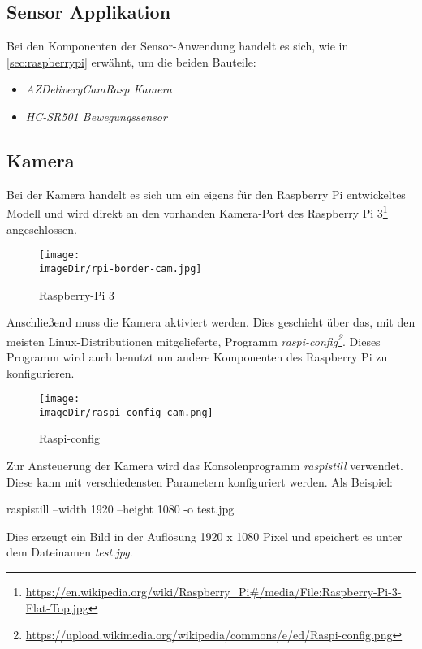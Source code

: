 \subsection{Sensor Applikation}

Bei den Komponenten der Sensor-Anwendung handelt es sich, wie in \autoref{sec:raspberrypi} erwähnt, um die beiden Bauteile:

\begin{itemize}
	\item \emph{AZDeliveryCamRasp Kamera}
	\item \emph{HC-SR501 Bewegungssensor}
\end{itemize}

\subsection{Kamera}

Bei der Kamera handelt es sich um ein eigens für den Raspberry Pi entwickeltes Modell und wird direkt an den vorhanden Kamera-Port des Raspberry Pi 3\footnote{\url{https://en.wikipedia.org/wiki/Raspberry_Pi\#/media/File:Raspberry-Pi-3-Flat-Top.jpg}} angeschlossen.

\begin{figure}[h]
	\centering
	\texttt{[image: \\imageDir/rpi-border-cam.jpg]}
	\caption{Raspberry-Pi 3}
	\label{fig:rpi-border-cam}
\end{figure}

Anschließend muss die Kamera aktiviert werden. Dies geschieht über das, mit den meisten Linux-Distributionen mitgelieferte, Programm \emph{raspi-config\footnote{\url{https://upload.wikimedia.org/wikipedia/commons/e/ed/Raspi-config.png}}}. Dieses Programm wird auch benutzt um andere Komponenten des Raspberry Pi zu konfigurieren.

\begin{figure}[h]
	\centering
	\texttt{[image: \\imageDir/raspi-config-cam.png]}
	\caption{Raspi-config}
	\label{fig:raspi-config-cam}
\end{figure}

Zur Ansteuerung der Kamera wird das Konsolenprogramm \emph{raspistill} verwendet. Diese kann mit verschiedensten Parametern konfiguriert werden. Als Beispiel:\\
\newline
\begin{code}
	raspistill --width 1920 --height 1080 -o test.jpg\\
\end{code}
\newline
Dies erzeugt ein Bild in der Auflösung 1920 x 1080 Pixel und speichert es unter dem Dateinamen \emph{test.jpg}.

